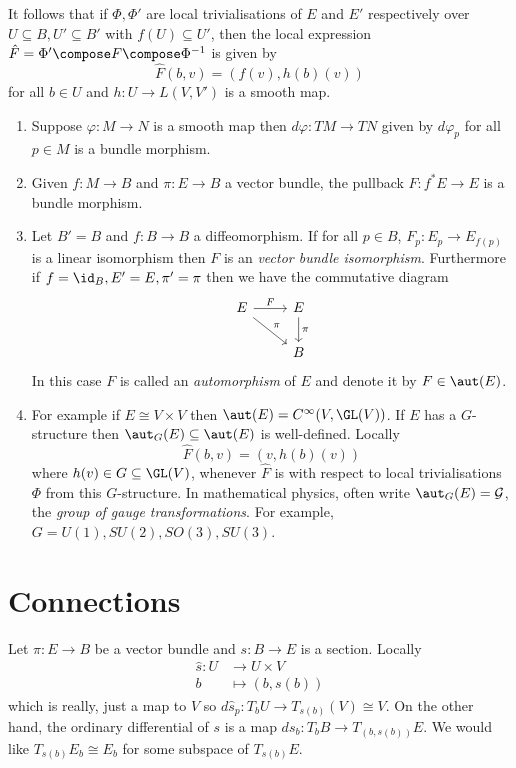 \documentclass[a4paper]{article}
\begin{document}
It follows that if \(\Phi, \Phi'\) are local trivialisations of \(E\) and \(E'\) respectively over \(U \subseteq B, U' \subseteq B'\) with \(f(U) \subseteq U'\), then the local expression \(\hat F = \Phi' \compose F \compose \Phi^{-1}\) is given by
\[
  \hat F(b, v) = (f(v), h(b)(v))
\]
for all \(b \in U\) and \(h: U \to L(V, V')\) is a smooth map.

\begin{eg}\leavevmode
  \begin{enumerate}
  \item Suppose \(\varphi: M \to N\) is a smooth map then \(d \varphi: TM \to TN\) given by \(d\varphi_p\) for all \(p \in M\) is a bundle morphism.
  \item Given \(f: M \to B\) and \(\pi: E \to B\) a vector bundle, the pullback \(F: f^*E \to E\) is a bundle morphism.
  \item Let \(B' = B\) and \(f: B \to B\) a diffeomorphism. If for all \(p \in B\), \(F_p: E_p \to E_{f(p)}\) is a linear isomorphism then \(F\) is an \emph{vector bundle isomorphism}. Furthermore if \(f = \id_B, E' = E, \pi' = \pi\) then we have the commutative diagram
    \[
      \begin{tikzcd}
        E \ar[r, "F"] \ar[dr, "\pi"] & E \ar[d, "\pi"] \\
        & B
      \end{tikzcd}
    \]
    In this case \(F\) is called an \emph{automorphism} of \(E\) and denote it by \(F \in \aut(E)\).
  \item For example if \(E \cong V \times V\) then \(\aut(E) = C^\infty(V, \GL(V))\). If \(E\) has a \(G\)-structure then \(\aut_G(E) \subseteq \aut(E)\) is well-defined. Locally
    \[
      \hat F(b, v) = (v, h(b)(v))
    \]
    where \(h(v) \in G \subseteq \GL(V)\), whenever \(\hat F\) is with respect to local trivialisations \(\Phi\) from this \(G\)-structure. In mathematical physics, often write \(\aut_G(E) = \mathcal G\), the \emph{group of gauge transformations}. For example, \(G = U(1), SU(2), SO(3), SU(3)\).
  \end{enumerate}
\end{eg}

\section{Connections}

Let \(\pi: E \to B\) be a vector bundle and \(s: B \to E\) is a section. Locally
\begin{align*}
  \hat s: U &\to U \times V \\
  b &\mapsto (b, s(b))
\end{align*}
which is really, just a map to \(V\) so \(d\hat s_p: T_bU \to T_{s(b)}(V) \cong V\). On the other hand, the ordinary differential of \(s\) is a map \(ds_b: T_b B \to T_{(b, s(b))}E\). We would like \(T_{s(b)}E_b \cong E_b\) for some subspace of \(T_{s(b)}E\).
\end{document}
